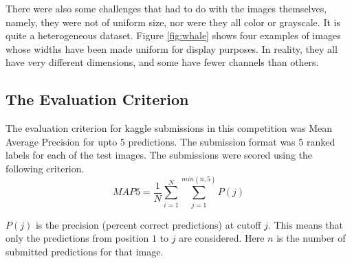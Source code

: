 There were also some challenges that had to do with the images themselves, namely, they were not of uniform size, nor were they all color or grayscale. It is quite a heterogeneous dataset. Figure \ref{fig:whale} shows four examples of images whose widths have been made uniform for display purposes. In reality, they all have very different dimensions, and some have fewer channels than others.\\

\subsection{The Evaluation Criterion}

The evaluation criterion for kaggle submissions in this competition was Mean Average Precision for upto 5 predictions. The submission format was 5 ranked labels for each of the test images. The submissions were scored using the following criterion.\\

$$
MAP5 = \frac{1}{N} \sum_{i=1}^{N} \sum_{j=1}^{min(n,5)} P(j)
$$

$P(j)$ is the precision (percent correct predictions) at cutoff $j$. This means that only the predictions from position $1$ to $j$ are considered. Here $n$ is the number of submitted predictions for that image.  